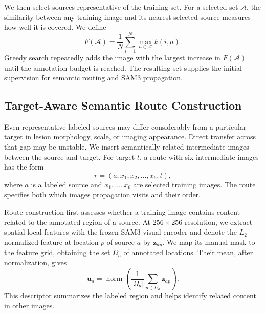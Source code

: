 \documentclass[a4paper,fleqn]{cas-dc}
\begin{document}
We then select sources representative of the training set. For a selected set $\mathcal{A}$, the similarity between any training image and its nearest selected source measures how well it is covered. We define
\begin{equation}
F(\mathcal{A})=
\frac{1}{N}\sum_{i=1}^{N}\max_{a\in\mathcal{A}}k(i,a).
\end{equation}
Greedy search repeatedly adds the image with the largest increase in $F(\mathcal{A})$ until the annotation budget is reached. The resulting set supplies the initial supervision for semantic routing and SAM3 propagation.

\subsection{Target-Aware Semantic Route Construction}
\label{sec:semantic-routing}

Even representative labeled sources may differ considerably from a particular target in lesion morphology, scale, or imaging appearance. Direct transfer across that gap may be unstable. We insert semantically related intermediate images between the source and target. For target $t$, a route with six intermediate images has the form
\begin{equation}
r=(a,x_1,x_2,\ldots,x_6,t),
\end{equation}
where $a$ is a labeled source and $x_1,\ldots,x_6$ are selected training images. The route specifies both which images propagation visits and their order.

Route construction first assesses whether a training image contains content related to the annotated region of a source. At $256\times256$ resolution, we extract spatial local features with the frozen SAM3 visual encoder and denote the $L_2$-normalized feature at location $p$ of source $a$ by $\mathbf{z}_{ap}$. We map its manual mask to the feature grid, obtaining the set $\Omega_a$ of annotated locations. Their mean, after normalization, gives
\begin{equation}
\mathbf{u}_a=
\operatorname{norm}\left(
\frac{1}{|\Omega_a|}\sum_{p\in\Omega_a}\mathbf{z}_{ap}
\right).
\end{equation}
This descriptor summarizes the labeled region and helps identify related content in other images.
\end{document}
